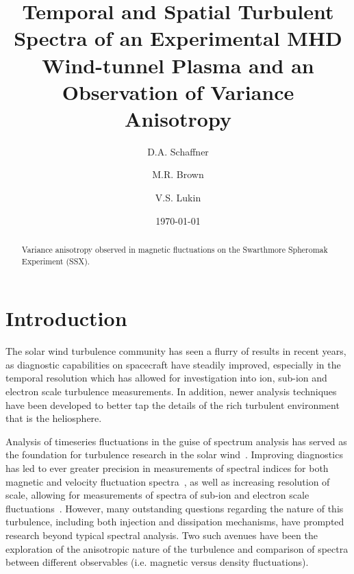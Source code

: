 \documentclass[aip,prl,amsmath,amssymb,reprint,superscriptaddress]{revtex4-1} %
\begin{document}
\title{Temporal and Spatial Turbulent Spectra of an Experimental MHD Wind-tunnel Plasma and an Observation of Variance Anisotropy}

\author{D.A. Schaffner}
\author{M.R. Brown}
\author{V.S. Lukin}

\date{\today}
\begin{abstract}
Variance anisotropy observed in magnetic fluctuations on the Swarthmore Spheromak Experiment (SSX).
\end{abstract}

\maketitle

\section{Introduction}

The solar wind turbulence community has seen a flurry of results in recent years, as diagnostic capabilities on spacecraft have steadily improved, especially in the temporal resolution which has allowed for investigation into ion, sub-ion and electron scale turbulence measurements. In addition, newer analysis techniques have been developed to better tap the details of the rich turbulent environment that is the heliosphere. 

Analysis of timeseries fluctuations in the guise of spectrum analysis has served as the foundation for turbulence research in the solar wind~\cite{goldstein95,tumarsch95}. Improving diagnostics has led to ever greater precision in measurements of spectral indices for both magnetic and velocity fluctuation spectra~\cite{podesta07}, as well as increasing resolution of scale, allowing for measurements of spectra of sub-ion and electron scale fluctuations~\cite{alexandrova09,sahraoui09}. However, many outstanding questions regarding the nature of this turbulence, including both injection and dissipation mechanisms, have prompted research beyond typical spectral analysis. Two such avenues have been the exploration of the anisotropic nature of the turbulence and comparison of spectra between different observables (i.e. magnetic versus density fluctuations).
\end{document}
